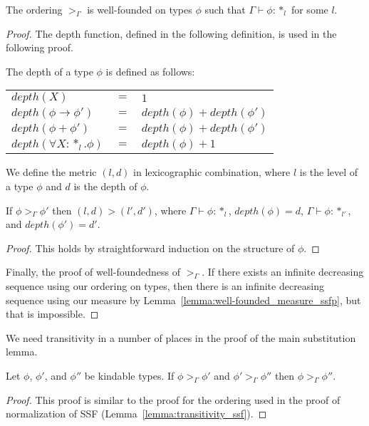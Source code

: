 \begin{thm}
  The ordering $>_\Gamma$ is well-founded on types $\phi$ such that 
  $\Gamma \vdash \phi:*_l$ for some $l$.
  \label{thm:well-founded_ordering_ssfp}
\end{thm}
\begin{proof}
  The depth function, defined in the following definition, is used in the following proof.

  \begin{definition}
    The depth of a type $\phi$ is defined as follows:
    \begin{center}
      \begin{tabular}{lll}
        $depth(X)$                  & $=$ & $1$\\
        $depth(\phi \to \phi')$     & $=$ & $depth(\phi) + depth(\phi')$\\
        $depth(\phi + \phi')$       & $=$ & $depth(\phi) + depth(\phi')$\\
        $depth(\forall X:*_l.\phi)$ & $=$ & $depth(\phi) + 1$\\
      \end{tabular}
    \end{center}
  \end{definition}

  We define the metric $(l,d)$ in lexicographic combination, where $l$
  is the level of a type $\phi$ and $d$ is the depth of $\phi$.

  \begin{lemma}
    \label{lemma:well-founded_measure_ssfp}
    If $\phi >_\Gamma \phi'$ then $(l,d) > (l',d')$, where $\Gamma \vdash \phi:*_l$, 
    $depth(\phi) = d$,  $\Gamma \vdash \phi:*_{l'}$, and $depth(\phi') = d'$.
  \end{lemma}
  \begin{proof}
    This holds by straightforward induction on the structure of
    $\phi$. 
  \end{proof}
  
  Finally, the proof of well-foundedness of $>_\Gamma$.  If there exists
  an infinite decreasing sequence using our ordering on types, then there
  is an infinite decreasing sequence using our measure by
  Lemma~\ref{lemma:well-founded_measure_ssfp}, but that is impossible.
\end{proof}
\noindent
We need transitivity in a number of places in the proof of the main
substitution lemma.  

\begin{lemma}
  Let $\phi$, $\phi'$, and $\phi''$ be kindable types.  If $\phi >_\Gamma \phi'$ and 
  $\phi' >_\Gamma \phi''$ then $\phi >_\Gamma \phi''$.
  \label{lemma:transitivity_ssfp}
\end{lemma}
\begin{proof}
  This proof is similar to the proof for the ordering used in the
  proof of normalization of SSF (Lemma~\ref{lemma:transitivity_ssf}).
\end{proof}

